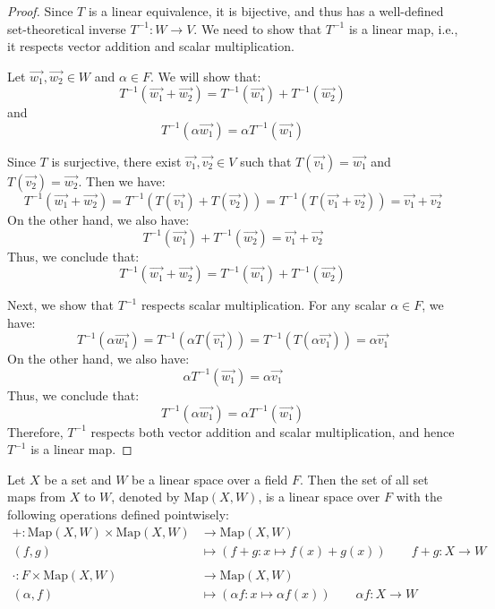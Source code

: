 \documentclass[11pt,fleqn]{book} %
\begin{document}
\begin{proof}
    Since \(T\) is a linear equivalence, it is bijective, and thus has a well-defined set-theoretical inverse \(T^{-1}: W \to V\). We need to show that \(T^{-1}\) is a linear map, i.e., it respects vector addition and scalar multiplication.

    Let \(\vec{w_1}, \vec{w_2} \in W\) and \(\alpha \in F\). We will show that:
    \[
        T^{-1}(\vec{w_1} + \vec{w_2}) = T^{-1}(\vec{w_1}) + T^{-1}(\vec{w_2})
    \]
    and
    \[
        T^{-1}(\alpha \vec{w_1}) = \alpha T^{-1}(\vec{w_1})
    \]

    Since \(T\) is surjective, there exist \(\vec{v_1}, \vec{v_2} \in V\) such that \(T(\vec{v_1}) = \vec{w_1}\) and \(T(\vec{v_2}) = \vec{w_2}\). Then we have:
    \[
        T^{-1}(\vec{w_1} + \vec{w_2}) = T^{-1}(T(\vec{v_1}) + T(\vec{v_2})) = T^{-1}(T(\vec{v_1} + \vec{v_2})) = \vec{v_1} + \vec{v_2}
    \]
    On the other hand, we also have:
    \[
        T^{-1}(\vec{w_1}) + T^{-1}(\vec{w_2}) = \vec{v_1} + \vec{v_2}
    \]
    Thus, we conclude that:
    \[
        T^{-1}(\vec{w_1} + \vec{w_2}) = T^{-1}(\vec{w_1}) + T^{-1}(\vec{w_2})
    \]

    Next, we show that \(T^{-1}\) respects scalar multiplication. For any scalar \(\alpha \in F\), we have:
    \[
        T^{-1}(\alpha \vec{w_1}) = T^{-1}(\alpha T(\vec{v_1})) = T^{-1}(T(\alpha \vec{v_1})) = \alpha \vec{v_1}
    \]
    On the other hand, we also have:
    \[
        \alpha T^{-1}(\vec{w_1}) = \alpha \vec{v_1}
    \]
    Thus, we conclude that:
    \[
        T^{-1}(\alpha \vec{w_1}) = \alpha T^{-1}(\vec{w_1})
    \]
    Therefore, \(T^{-1}\) respects both vector addition and scalar multiplication, and hence \(T^{-1}\) is a linear map.
\end{proof}

\begin{proposition}
    Let $X$ be a set and $W$ be a linear space over a field $F$. Then the set of all set maps from $X$ to $W$, denoted by $\text{Map}(X, W)$, is a linear space over $F$ with the following operations defined pointwisely:
    \[
        \begin{split}
            + : \text{Map}(X, W) \times \text{Map}(X, W) &\to \text{Map}(X, W) \\
            (f,g) &\mapsto (f+g: x \mapsto f(x) + g(x)) \qquad f + g : X \to W \\ \\
            \cdot : F \times \text{Map}(X, W) &\to \text{Map}(X, W) \\
            (\alpha,f) &\mapsto (\alpha f: x \mapsto \alpha f(x)) \qquad \alpha f : X \to W
        \end{split}
    \]
\end{proposition}
\end{document}
